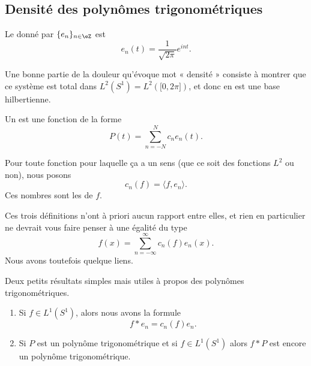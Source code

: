 \subsection{Densité des polynômes trigonométriques}

\begin{definition}      \label{DEFooGCZAooFecAHB}
    Le  donné par \( \{ e_n \}_{n\in \eZ}\) est
    \begin{equation}
        e_n(t)= \frac{1}{ \sqrt{ 2\pi } } e^{int}.
    \end{equation}
\end{definition}

Une bonne partie de la douleur qu'évoque mot « densité » consiste à montrer que ce système est total dans \( L^2(S^1)=L^2(\mathopen[ 0 , 2\pi \mathclose])\), et donc en est une base hilbertienne.

\begin{definition}
    Un  est une fonction de la forme
    \begin{equation}
        P(t)=\sum_{n=-N}^Nc_n e_n(t).
    \end{equation}
\end{definition}

\begin{definition}
    Pour toute fonction pour laquelle ça a un sens (que ce soit des fonctions \( L^2\) ou non), nous posons
    \begin{equation}\label{EqhIPoPH}
        c_n(f)=\langle f, e_n\rangle .
    \end{equation}
    Ces nombres sont les  de \( f\). 
\end{definition}

Ces trois définitions n'ont à priori aucun rapport entre elles, et rien en particulier ne devrait vous faire penser à une égalité du type
\begin{equation}
    f(x)=\sum_{n=-\infty}^{\infty}c_n(f)e_n(x).
\end{equation}
Nous avons toutefois quelque liens.

\begin{lemma}   \label{LemZVfZlms}
    Deux petits résultats simples mais utiles à propos des polynômes trigonométriques.
    \begin{enumerate}
        \item
    Si \( f\in L^1(S^1)\), alors nous avons la formule
    \begin{equation}
        f*e_n=c_n(f)e_n.
    \end{equation}
\item

    Si \( P\) est un polynôme trigonométrique et si \( f\in L^1(S^1)\) alors \( f*P\) est encore un polynôme trigonométrique.
    \end{enumerate}
\end{lemma}

